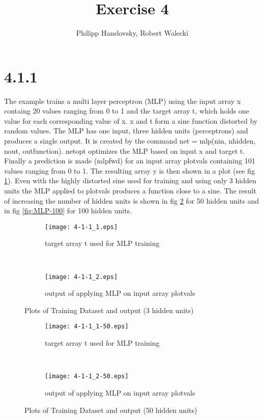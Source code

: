 \documentclass[a4paper,11pt]{article}
\title{Exercise 4}
\author{Philipp Hanslovsky, Robert Walecki}
\theoremstyle{definition}
\theoremstyle{plain}
\theoremstyle{remark}
\begin{document}
\maketitle

\section*{4.1.1}


The example trains a multi layer perceptron (MLP) using the input array x containg 20 values ranging from 0 to 1 and the target array t, which holds one value for each corresponding value of x. x and t form a sine function distorted by random values. The MLP has one input, three hidden units (perceptrons) and produces a single output. It is created by the command net = mlp(nin, nhidden, nout, outfunction). netopt optimizes the MLP based on input x and target t. Finally a prediction is made (mlpfwd) for an input array plotvals containing 101 values ranging from 0 to 1. The resulting array y is then shown in a plot (see fig \ref{fig:MLP}). Even with the highly distorted sine used for training and using only 3 hidden units the MLP applied to plotvals produces a function close to a sine. The result of increasing the number of hidden units is shown in fig \ref{fig:MLP-50} for 50 hidden units and in fig \ref{fig:MLP-100} for 100 hidden units.


\begin{figure}
\begin{subfigure}[b]{0.45\textwidth}
\centering
\texttt{[image: 4-1-1\_1.eps]}
\caption{target array t used for MLP training}
\end{subfigure}
~
\begin{subfigure}[b]{0.45\textwidth}
\centering
\texttt{[image: 4-1-1\_2.eps]}
\caption{output of applying MLP on input array plotvals}
\end{subfigure}

\centering
\caption{Plots of Training Dataset and output (3 hidden units)}
\label{fig:MLP}
\end{figure}


\begin{figure}
\begin{subfigure}[b]{0.45\textwidth}
\centering
\texttt{[image: 4-1-1\_1-50.eps]}
\caption{target array t used for MLP training}
\end{subfigure}
~
\begin{subfigure}[b]{0.45\textwidth}
\centering
\texttt{[image: 4-1-1\_2-50.eps]}
\caption{output of applying MLP on input array plotvals}
\end{subfigure}

\centering
\caption{Plots of Training Dataset and output (50 hidden units)}
\label{fig:MLP-50}
\end{figure}
\end{document}
